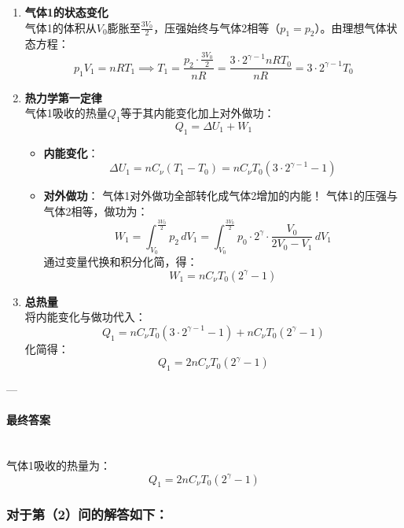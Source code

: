 \documentclass{article}
\begin{document}
{\begin{enumerate}
    \item \textbf{气体1的状态变化}  \\
    气体1的体积从\( V_0 \)膨胀至\( \frac{3V_0}{2} \)，压强始终与气体2相等（\( p_1 = p_2 \)）。由理想气体状态方程：  
    \[
    p_1 V_1 = nRT_1 \implies T_1 = \frac{p_2 \cdot \frac{3V_0}{2}}{nR} = \frac{3 \cdot 2^{\gamma-1} nRT_0}{nR} = 3 \cdot 2^{\gamma-1} T_0
    \]

    \item \textbf{热力学第一定律}  \\
    气体1吸收的热量\( Q_1 \)等于其内能变化加上对外做功：  
    \[
    Q_1 = \Delta U_1 + W_1
    \]  
    \begin{itemize}
        \item \textbf{内能变化}：  
        \[
        \Delta U_1 = nC_\nu (T_1 - T_0) = nC_\nu T_0 \left( 3 \cdot 2^{\gamma-1} - 1 \right)
        \]  
        \item \textbf{对外做功}：  
        {\color{red}气体1对外做功全部转化成气体2增加的内能！}
        气体1的压强与气体2相等，做功为：  
        \[
        W_1 = \int_{V_0}^{\frac{3V_0}{2}} p_2 \, dV_1 = \int_{V_0}^{\frac{3V_0}{2}} p_0 \cdot 2^\gamma \cdot \frac{V_0}{2V_0 - V_1} \, dV_1
        \]  
        通过变量代换和积分化简，得：  
        \[
        W_1 = nC_\nu T_0 \left( 2^{\gamma} - 1 \right)
        \]
    \end{itemize}

    \item \textbf{总热量}  \\
    将内能变化与做功代入：  
    \[
    Q_1 = nC_\nu T_0 \left( 3 \cdot 2^{\gamma-1} - 1 \right) + nC_\nu T_0 \left( 2^{\gamma} - 1 \right)
    \]  
    化简得：  
    \[
    Q_1 = 2nC_\nu T_0 \left( 2^{\gamma} - 1 \right)
    \]
\end{enumerate}

---

\paragraph*{最终答案} \mbox{} \\

气体1吸收的热量为：  
\[
\boxed{
Q_1 = 2nC_\nu T_0 \left( 2^{\gamma} - 1 \right)
}
\]




\subsubsection*{对于第（2）问的解答如下：}

}
\end{document}
